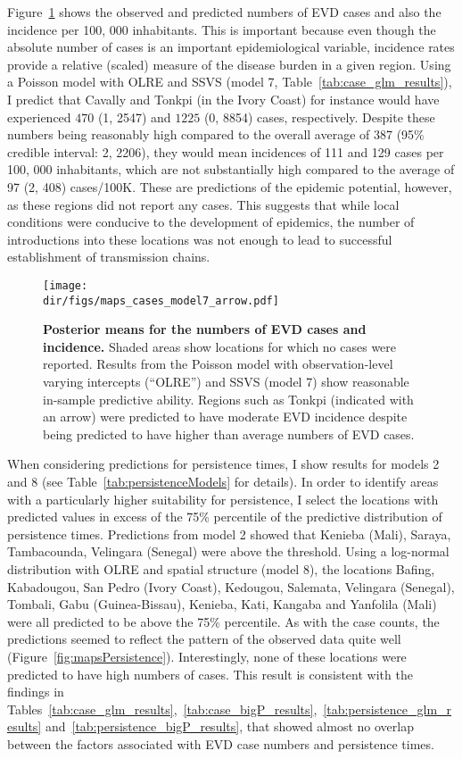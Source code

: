 Figure~\ref{fig:mapsCases} shows the observed and predicted numbers of EVD cases and also the incidence per 100, 000 inhabitants.
This is important because even though the absolute number of cases is an important epidemiological variable, incidence rates provide a relative (scaled) measure of the disease burden in a given region.
Using a Poisson model with OLRE and SSVS (model 7, Table~\ref{tab:case_glm_results}), I predict that Cavally and Tonkpi (in the Ivory Coast) for instance would have experienced $470$ (1, 2547) and $1225$ (0, 8854) cases, respectively.
Despite these numbers being reasonably high compared to the overall average of 387 (95\% credible interval: 2, 2206), they would mean incidences of 111 and 129 cases per 100, 000 inhabitants, which are not substantially high compared to the average of 97 (2, 408) cases/100K.
These are predictions of the epidemic potential, however, as these regions did not report any cases.
This suggests that while local conditions were conducive to the development of epidemics, the number of introductions into these locations was not enough to lead to successful establishment of transmission chains. 

\begin{figure}[htbp]
  \centering
  \texttt{[image: \\dir/figs/maps\_cases\_model7\_arrow.pdf]}
  \caption[Case counts predictions]{\textbf{Posterior means for the numbers of EVD cases and incidence.}
  Shaded areas show locations for which no cases were reported.
  Results from the Poisson model with observation-level varying intercepts (``OLRE'') and SSVS (model 7) show reasonable in-sample predictive ability.
  Regions such as Tonkpi (indicated with an arrow) were predicted to have moderate EVD incidence despite being predicted to have higher than average numbers of EVD cases.
  }
  \label{fig:mapsCases}
\end{figure}

When considering predictions for persistence times, I show results for models 2 and 8 (see Table~\ref{tab:persistenceModels} for details).
In order to identify areas with a particularly higher suitability for persistence, I select the locations with predicted values in excess of the 75\% percentile of the predictive distribution of persistence times.
Predictions from model 2 showed that Kenieba (Mali), Saraya, Tambacounda, Velingara (Senegal) were above the threshold.
Using a log-normal distribution with OLRE and spatial structure (model 8), the locations Bafing, Kabadougou, San Pedro (Ivory Coast), Kedougou, Salemata, Velingara (Senegal), Tombali, Gabu (Guinea-Bissau), Kenieba, Kati, Kangaba and Yanfolila (Mali) were all predicted to be above the 75\% percentile.
As with the case counts, the predictions seemed to reflect the pattern of the observed data quite well (Figure~\ref{fig:mapsPersistence}).
Interestingly, none of these locations were predicted to have high numbers of cases.
This result is consistent with the findings in Tables~\ref{tab:case_glm_results},~\ref{tab:case_bigP_results},~\ref{tab:persistence_glm_results} and~\ref{tab:persistence_bigP_results}, that showed almost no overlap between the factors associated with EVD case numbers and persistence times.

